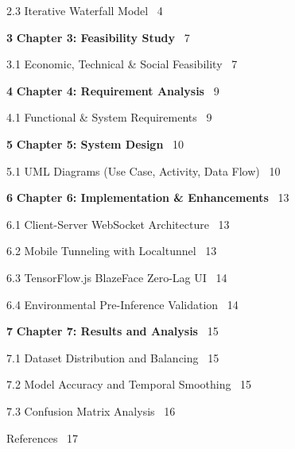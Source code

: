 \documentclass[12pt,a4paper]{report}
\begin{document}
\hspace{1.2cm}2.3 \quad Iterative Waterfall Model \dotfill\ 4

\bigskip

\noindent \textbf{3} \quad \textbf{Chapter 3: Feasibility Study} \dotfill\ 7

\hspace{1.2cm}3.1 \quad Economic, Technical & Social Feasibility \dotfill\ 7

\bigskip

\noindent \textbf{4} \quad \textbf{Chapter 4: Requirement Analysis} \dotfill\ 9

\hspace{1.2cm}4.1 \quad Functional \& System Requirements \dotfill\ 9

\bigskip

\noindent \textbf{5} \quad \textbf{Chapter 5: System Design} \dotfill\ 10

\hspace{1.2cm}5.1 \quad UML Diagrams (Use Case, Activity, Data Flow) \dotfill\ 10

\bigskip

\noindent \textbf{6} \quad \textbf{Chapter 6: Implementation \& Enhancements} \dotfill\ 13

\hspace{1.2cm}6.1 \quad Client-Server WebSocket Architecture \dotfill\ 13

\hspace{1.2cm}6.2 \quad Mobile Tunneling with Localtunnel \dotfill\ 13

\hspace{1.2cm}6.3 \quad TensorFlow.js BlazeFace Zero-Lag UI \dotfill\ 14

\hspace{1.2cm}6.4 \quad Environmental Pre-Inference Validation \dotfill\ 14

\bigskip

\noindent \textbf{7} \quad \textbf{Chapter 7: Results and Analysis} \dotfill\ 15

\hspace{1.2cm}7.1 \quad Dataset Distribution and Balancing \dotfill\ 15

\hspace{1.2cm}7.2 \quad Model Accuracy and Temporal Smoothing \dotfill\ 15

\hspace{1.2cm}7.3 \quad Confusion Matrix Analysis \dotfill\ 16

\bigskip

 \quad References \dotfill\ 17
\end{document}
